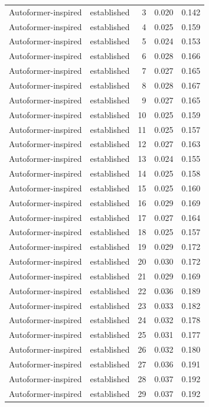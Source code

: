 \begin{tabular}{llrrr}
Autoformer-inspired & established & 3 & 0.020 & 0.142 \\
Autoformer-inspired & established & 4 & 0.025 & 0.159 \\
Autoformer-inspired & established & 5 & 0.024 & 0.153 \\
Autoformer-inspired & established & 6 & 0.028 & 0.166 \\
Autoformer-inspired & established & 7 & 0.027 & 0.165 \\
Autoformer-inspired & established & 8 & 0.028 & 0.167 \\
Autoformer-inspired & established & 9 & 0.027 & 0.165 \\
Autoformer-inspired & established & 10 & 0.025 & 0.159 \\
Autoformer-inspired & established & 11 & 0.025 & 0.157 \\
Autoformer-inspired & established & 12 & 0.027 & 0.163 \\
Autoformer-inspired & established & 13 & 0.024 & 0.155 \\
Autoformer-inspired & established & 14 & 0.025 & 0.158 \\
Autoformer-inspired & established & 15 & 0.025 & 0.160 \\
Autoformer-inspired & established & 16 & 0.029 & 0.169 \\
Autoformer-inspired & established & 17 & 0.027 & 0.164 \\
Autoformer-inspired & established & 18 & 0.025 & 0.157 \\
Autoformer-inspired & established & 19 & 0.029 & 0.172 \\
Autoformer-inspired & established & 20 & 0.030 & 0.172 \\
Autoformer-inspired & established & 21 & 0.029 & 0.169 \\
Autoformer-inspired & established & 22 & 0.036 & 0.189 \\
Autoformer-inspired & established & 23 & 0.033 & 0.182 \\
Autoformer-inspired & established & 24 & 0.032 & 0.178 \\
Autoformer-inspired & established & 25 & 0.031 & 0.177 \\
Autoformer-inspired & established & 26 & 0.032 & 0.180 \\
Autoformer-inspired & established & 27 & 0.036 & 0.191 \\
Autoformer-inspired & established & 28 & 0.037 & 0.192 \\
Autoformer-inspired & established & 29 & 0.037 & 0.192 \\

\end{tabular}
